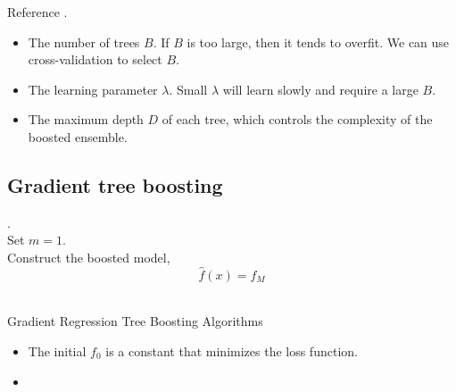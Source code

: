 \begin{refsection}
\begin{remark}
Reference \cite[322]{james2013introduction}.
\end{remark}

\begin{remark}\hfill
\begin{itemize}
	\item The number of trees $B$. If $B$ is too large, then it tends to overfit. We can use cross-validation to select $B$.
	\item The learning parameter $\lambda$. Small $\lambda$ will learn slowly and require a large $B$.
	\item The maximum depth $D$ of each tree, which controls the complexity of the boosted ensemble.  
\end{itemize}
\end{remark}



\subsection{Gradient tree boosting }

\begin{algorithm}[H]
	\SetAlgoLined
	.\\
	Set $m = 1$. \\
	Construct the boosted model,
	$$\hat{f}(x) = f_M$$\\
	\caption{Gradient Regression Tree Boosting Algorithms}
\end{algorithm}


\begin{remark}[interpretation]\hfill
	\begin{itemize}
		\item The initial $f_0$ is a constant that minimizes the loss function.
		\item 
	\end{itemize}
\end{remark}



\end{refsection}
